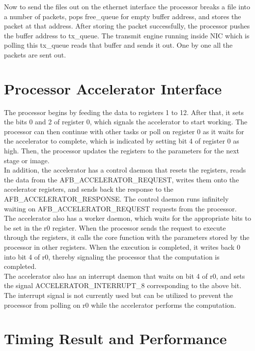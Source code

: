 \documentclass[12pt]{report}
\begin{document}
Now to send the files out on the ethernet interface the processor breaks a file into a number of packets, pops free\_queue for empty buffer address, and stores the packet at that address. After storing the packet successfully, the processor pushes the buffer address to tx\_queue. The transmit engine running inside NIC which is polling this tx\_queue reads that buffer and sends it out. One by one all the packets are sent out.



\section{Processor Accelerator Interface}

The processor begins by feeding the data to registers 1 to 12. After that, it sets the bits 0 and 2 of register 0, which signals the accelerator to start working. The processor can then continue with other tasks or poll on register 0 as it waits for the accelerator to complete, which is indicated by setting bit 4 of register 0 as high. Then, the processor updates the registers to the parameters for the next stage or image.
\\

In addition, the accelerator has a control daemon that resets the registers, reads the data from the AFB\_ACCELERATOR\_REQUEST, writes them onto the accelerator registers, and sends back the response to the AFB\_ACCELERATOR\_RESPONSE. The control daemon runs infinitely waiting on AFB\_ACCELERATOR\_REQUEST requests from the processor.
\\

The accelerator also has a worker daemon, which waits for the appropriate bits to be set in the r0 register. When the processor sends the request to execute through the registers, it calls the core function with the parameters stored by the processor in other registers. When the execution is completed, it writes back 0 into bit 4 of r0, thereby signaling the processor that the computation is completed.
\\

The accelerator also has an interrupt daemon that waits on bit 4 of r0, and sets the signal ACCELERATOR\_INTERRUPT\_8 corresponding to the above bit. The interrupt signal is not currently used but can be utilized to prevent the processor from polling on r0 while the accelerator performs the computation.
\\

\section{Timing Result and Performance}
\end{document}
